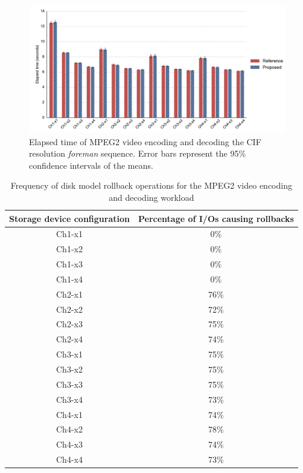 \begin{figure}[htpb]
	\centering
	\includegraphics[width=\textwidth]{figures/ch6-fig-12.pdf}
	\caption[Elapsed time of MPEG2 video encoding and decoding.]{\label{fig:ch6-fig-12}Elapsed time of MPEG2 video encoding and decoding the CIF resolution \textit{foreman} sequence. Error bars represent the 95\% confidence intervals of the means.}
\end{figure}

\begin{table}[htbp]%
	\centering
	\caption{Frequency of disk model rollback operations for the MPEG2 video encoding and decoding workload}\label{tab:ch6-8-rollback}
	\noindent\begin{tabular}{cc}
		\toprule
		Storage device configuration &
		Percentage of I/Os causing rollbacks \\
		\midrule
		Ch1-x1 & 0\% \\
		Ch1-x2 & 0\% \\
		Ch1-x3 & 0\% \\
		Ch1-x4 & 0\% \\
		Ch2-x1 & 76\% \\
		Ch2-x2 & 72\% \\
		Ch2-x3 & 75\% \\
		Ch2-x4 & 74\% \\
		Ch3-x1 & 75\% \\
		Ch3-x2 & 75\% \\
		Ch3-x3 & 75\% \\
		Ch3-x4 & 73\% \\
		Ch4-x1 & 74\% \\
		Ch4-x2 & 78\% \\
		Ch4-x3 & 74\% \\
		Ch4-x4 & 73\% \\
		\bottomrule
	\end{tabular}
\end{table}%

